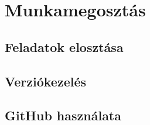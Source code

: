\section{Munkamegosztás}

\subsection{Feladatok elosztása}
\subsection{Verziókezelés}
\subsection{GitHub használata}
